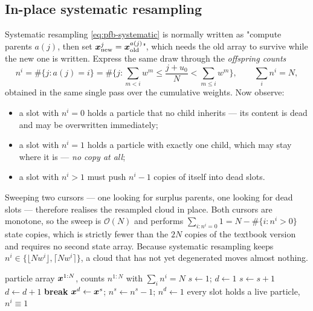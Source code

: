 \subsection{In-place systematic resampling}
Systematic resampling \eqref{eq:pfb-systematic} is normally written as "compute parents $a(j)$,
then set $\bm{x}^j_{\mathrm{new}} = \bm{x}^{a(j)}_{\mathrm{old}}$", which needs the old array to survive
while the new one is written.  Express the same draw through the \emph{offspring counts}
\begin{equation}
  n^i = \#\{ j : a(j) = i \} = \#\Big\{ j : \textstyle\sum_{m<i} w^m \le \frac{j+u_0}{N} < \sum_{m\le i} w^m \Big\},
  \qquad \sum_i n^i = N,
  \label{eq:pff-counts}
\end{equation}
obtained in the same single pass over the cumulative weights.  Now observe:
\begin{itemize}[leftmargin=2em]
  \item a slot with $n^i = 0$ holds a particle that no child inherits --- its content is dead and
        may be overwritten immediately;
  \item a slot with $n^i = 1$ holds a particle with exactly one child, which may stay where it is
        --- \emph{no copy at all};
  \item a slot with $n^i > 1$ must push $n^i - 1$ copies of itself into dead slots.
\end{itemize}
Sweeping two cursors --- one looking for surplus parents, one looking for dead slots --- therefore
realises the resampled cloud in place.  Both cursors are monotone, so the sweep is $\mathcal{O}(N)$
and performs
$\sum_{i: n^i = 0} 1 = N - \#\{i : n^i > 0\}$
state copies, which is strictly fewer than the $2N$ copies of the textbook version and requires no
second state array.  Because systematic resampling keeps $n^i \in \{\lfloor Nw^i\rfloor, \lceil
Nw^i\rceil\}$, a cloud that has not yet degenerated moves almost nothing.

\begin{algorithm}[H]
\caption{In-place redistribution from offspring counts}
\begin{algorithmic}[1]
\Require particle array $\bm{x}^{1:N}$, counts $n^{1:N}$ with $\sum_i n^i = N$
\State $s \gets 1$; \; $d \gets 1$
\Loop
   \State $s \gets s+1$  \EndWhile
   \State $d \gets d+1$  \EndWhile
   \State \textbf{break} \EndIf
  \State $\bm{x}^d \gets \bm{x}^s$; \quad $n^s \gets n^s - 1$; \quad $n^d \gets 1$
\EndLoop
\Ensure every slot holds a live particle, $n^i \equiv 1$
\end{algorithmic}
\end{algorithm}


